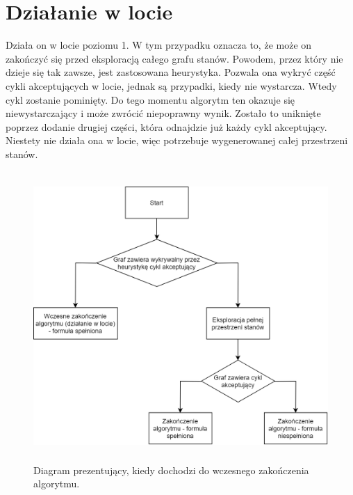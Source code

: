 \section{Działanie w locie}

Działa on w locie poziomu 1.
W tym przypadku oznacza to, że może on zakończyć się przed eksploracją całego grafu stanów.
Powodem, przez który nie dzieje się tak zawsze, jest zastosowana heurystyka.
Pozwala ona wykryć część cykli akceptujących w locie, jednak są przypadki, kiedy nie wystarcza.
Wtedy cykl zostanie pominięty.
Do tego momentu algorytm ten okazuje się niewystarczający i może zwrócić niepoprawny wynik.
Zostało to uniknięte poprzez dodanie drugiej części, która odnajdzie już każdy cykl akceptujący.
Niestety nie działa ona w locie, więc potrzebuje wygenerowanej całej przestrzeni stanów.

\begin{figure}[h]
    \centering
    \includegraphics[height=11cm,keepaspectratio]{img/on-the-fly-diagram.png}
    \caption{Diagram prezentujący, kiedy dochodzi do wczesnego zakończenia algorytmu.}
    \label{fig:ltl_model_checking}
\end{figure}
